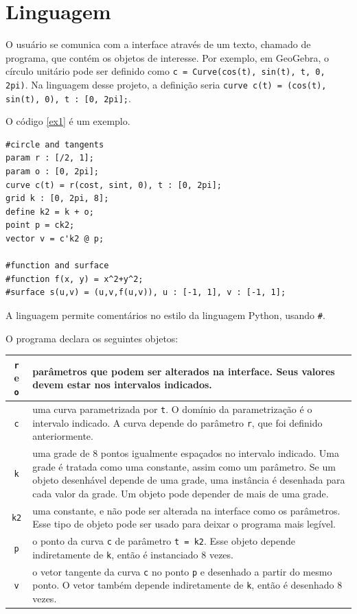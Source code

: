 \chapter{Linguagem}
\label{lang}

O usuário se comunica com a interface através de um texto, chamado de programa,
que contém os objetos de interesse. 
Por exemplo, em GeoGebra, o círculo unitário pode ser
definido como
\texttt{c = Curve(cos(t), sin(t), t, 0, 2pi)}.
Na linguagem desse projeto, a definição seria
\texttt{curve c(t) = (cos(t), sin(t), 0), t : [0, 2pi];}.

O código \ref{ex1} é um exemplo.
\begin{lstlisting}[caption=Exemplo de objetos,label=ex1]
#circle and tangents
param r : [/2, 1];
param o : [0, 2pi];
curve c(t) = r(cost, sint, 0), t : [0, 2pi];
grid k : [0, 2pi, 8];
define k2 = k + o;
point p = ck2;
vector v = c'k2 @ p;

#function and surface
#function f(x, y) = x^2+y^2;
#surface s(u,v) = (u,v,f(u,v)), u : [-1, 1], v : [-1, 1];
\end{lstlisting}

A linguagem permite comentários no estilo da linguagem Python, usando \texttt{\#}.

O programa declara os seguintes objetos:

\begin{centering}
\begin{tabularx}{\textwidth}{||c|X||}
    \hline
    \texttt{r} e \texttt{o} & parâmetros que podem ser alterados na interface.
    Seus valores devem estar nos intervalos indicados. \\ 

    \hline
    \texttt{c} & uma curva parametrizada por \texttt{t}.
    O domínio da parametrização é o intervalo indicado.
    A curva depende do parâmetro \texttt{r}, que foi definido anteriormente. \\

    \hline
    \texttt{k} & uma grade de 8 pontos igualmente espaçados no intervalo indicado.
    Uma grade é tratada como uma constante, assim como um parâmetro.
    Se um objeto desenhável depende de uma grade, uma instância é desenhada para cada valor da grade.
    Um objeto pode depender de mais de uma grade. \\

    \hline
    \texttt{k2} & uma constante, e não pode ser alterada na interface como os parâmetros.
    Esse tipo de objeto pode ser usado para deixar o programa mais legível. \\
    
    \hline
    \texttt{p} & o ponto da curva \texttt{c} de parâmetro \texttt{t = k2}.
    Esse objeto depende indiretamente de \texttt{k}, então é instanciado 8 vezes. \\
    
    \hline
    \texttt{v} & o vetor tangente da curva \texttt{c} no ponto \texttt{p} 
    e desenhado a partir do mesmo ponto.
    O vetor também depende indiretamente de \texttt{k}, então é desenhado 8 vezes. \\
    \hline
\end{tabularx}
\end{centering}

